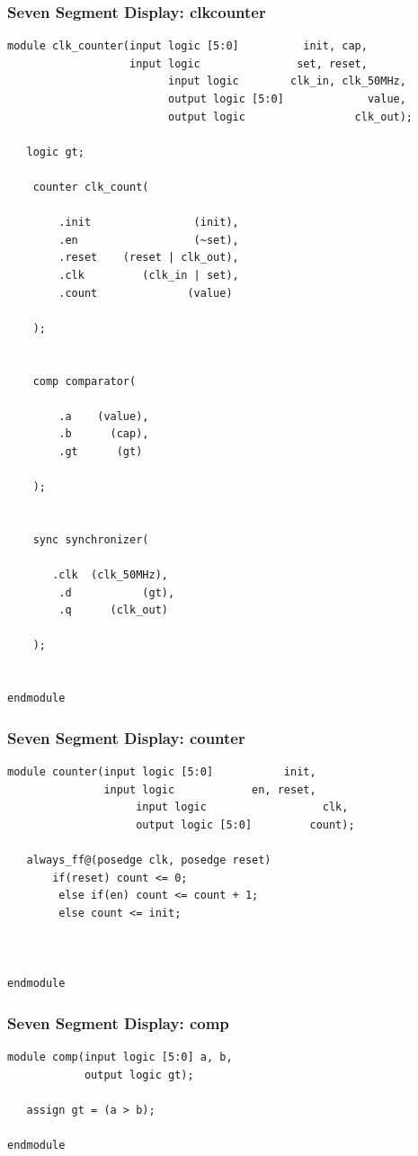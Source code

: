 \documentclass[a4paper]{article}
\begin{document}
\subsubsection{Seven Segment Display: clkcounter}
\begin{Verbatim}
module clk_counter(input logic [5:0]          init, cap,
                   input logic               set, reset,
						 input logic        clk_in, clk_50MHz,
						 output logic [5:0]             value,
						 output logic                 clk_out);

   logic gt;
	
	counter clk_count(
	   
		.init                (init),
		.en                  (~set),
		.reset    (reset | clk_out),
		.clk         (clk_in | set),
		.count              (value)
	
	);
	
	
	comp comparator(
	   
		.a    (value),   
		.b      (cap),
		.gt      (gt)
	
	);
	

	sync synchronizer(
	
	   .clk  (clk_50MHz),
		.d           (gt),
		.q      (clk_out)
	
	);
	

endmodule 
\end{Verbatim}

\subsubsection{Seven Segment Display: counter}
\begin{Verbatim}
module counter(input logic [5:0]           init,
               input logic            en, reset,
					input logic                  clk,
					output logic [5:0]         count);
					
   always_ff@(posedge clk, posedge reset)
	   if(reset) count <= 0;
		else if(en) count <= count + 1;
		else count <= init;



endmodule 
\end{Verbatim}

\subsubsection{Seven Segment Display: comp}
\begin{Verbatim}
module comp(input logic [5:0] a, b,
            output logic gt);
 
   assign gt = (a > b);

endmodule 
\end{Verbatim}
\end{document}
